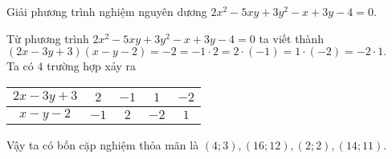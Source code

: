 \begin{ex}%
    Giải phương trình nghiệm nguyên dương $2x^2-5xy+3y^2-x+3y-4=0.$
\loigiai
    {Từ phương trình $2x^2-5xy+3y^2-x+3y-4=0$ ta viết thành\\ $\left({2x-3y+3}\right)\left({x-y-2}\right)=-2=-1 \cdot 2=2 \cdot \left({-1}\right)=1\cdot \left({-2}\right)=-2 \cdot1.$\\
    	Ta có $4$ trường hợp xảy ra
   \begin{center}
   		\begin{tabular}{|c|c|c|c|c|}
   		\hline 
   		$2x-3y+3$ & $2$ & $-1$&$1$&$-2$ \\ \hline
   		$x-y-2$& $-1$ & $2$&$-2$&$1$ \\ \hline
   	\end{tabular}
   \end{center}
    
    	Vậy ta có bốn cặp nghiệm thỏa mãn là $\left({4;3}\right),\left({16;12}\right),\left({2;2}\right),\left({14;11}\right)$. 
    }
\end{ex}

